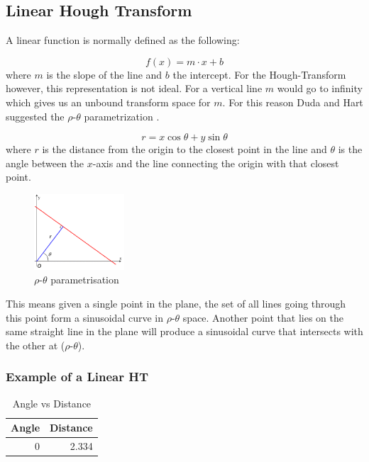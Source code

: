 \documentclass[10pt,twoside]{scrreprt}
\begin{document}
\subsection{Linear Hough Transform} %
\label{sub:linear_hough_transform}

A linear function is normally defined as the following:

\[
  f(x) = m\cdot x + b
\]
where $m$ is the slope of the line and $b$ the intercept. For the Hough-Transform however, this representation is not ideal. For a vertical line $m$ would go to infinity which gives us an unbound transform space for $m$. For this reason Duda and Hart suggested the $\rho\text{-}\theta$ parametrization \parencite{Duda:1972}.

\[
  r = x\cos\theta + y\sin\theta
\]
where $r$ is the distance from the origin to the closest point in the line and $\theta$ is the angle between the $x$-axis and the line connecting the origin with that closest point.

\begin{figure}[h]
  \centering
  \includegraphics[width=0.3\textwidth]{pics/R_theta_line.png}
  \caption{$\rho\text{-}\theta$ parametrisation}
  \label{fig:rhotheta}
\end{figure}

This means given a single point in the plane, the set of all lines going through this point form a sinusoidal curve in $\rho\text{-}\theta$ space. Another point 
that lies on the same straight line in the plane will produce a sinusoidal curve that intersects with the other at ($\rho\text{-}\theta$).

\subsubsection{Example of a Linear HT} %
\label{ssub:example_of_a_linear_ht}

\begin{table}
\centering
\caption{Angle vs Distance}
\begin{tabular}{rr}
\toprule
 Angle & Distance \\
\midrule
0 & 2.334 \\
\bottomrule
\end{tabular}
\end{table}
\end{document}
